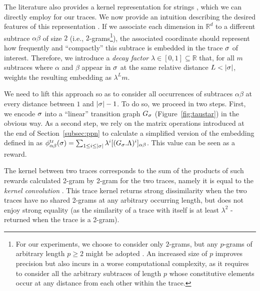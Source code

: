 The literature also provides a kernel representation for strings \cite{LodhiSSCW02,Raedt,GartnerFW03}, which we can directly employ for our traces. We now provide an intuition describing the desired features of this representation \cite{LodhiSSCW02}. If we associate each dimension in $\mathbb{R}^d$ to a different subtrace $\alpha\beta$ of size $2$ (i.e., $2$-grams\footnote{\label{fn:caveat}For our experiments, we choose to consider only $2$-grams, but any $p$-grams of arbitrary length $p\geq 2$ might be adopted \cite{Gartner03}. An increased size of $p$ improves precision but also incurs in a worse computational complexity, as it requires to consider all the arbitrary subtraces of length $p$ whose constitutive elements occur at any distance from each other within the trace.}), the associated coordinate should represent how frequently and ``compactly'' this subtrace is embedded in the trace $\sigma$ of interest. Therefore, we introduce a \emph{decay factor} $\lambda\in[0,1]\subseteq\mathbb{R}$ that, for all $m$ subtraces where $\alpha$ and $\beta$ appear in $\sigma$ at the same relative distance $L < |\sigma|$, weights the resulting embedding as $\lambda^Lm$.

We need to lift this approach so as to consider all occurrences of subtraces $\alpha\beta$ at every distance between $1$ and $|\sigma|-1$. To do so, we proceed in two steps. First, we encode $\sigma$ into a ``linear'' transition graph $G_\sigma$ (Figure~\ref{fig:taustar}) in the obvious way. %
As a second step, we rely on the matrix operations introduced at the end of Section~\ref{subsec:ppn} to calculate a simplified version of the embedding defined in \cite{LodhiSSCW02,Raedt} as $\phi^{\text{tr}}_{\alpha\beta}(\sigma)=\sum_{1\leq i\leq |\sigma|}\lambda^i[(G_{\sigma}.\Lambda)^i]_{\alpha\beta}$. %
This value can be seen as a reward.

The kernel between two traces corresponds to the sum of the products of such rewards calculated 2-gram by 2-gram for the two traces, namely it is equal to the \emph{kernel convolution} \cite{Haussler}. %
This trace kernel returns strong dissimilarity when the two traces have no shared 2-grams at any arbitrary occurring length, but does not enjoy strong equality (as the similarity of a trace with itself is at least $\lambda^2$ - returned when the trace is a 2-gram).

